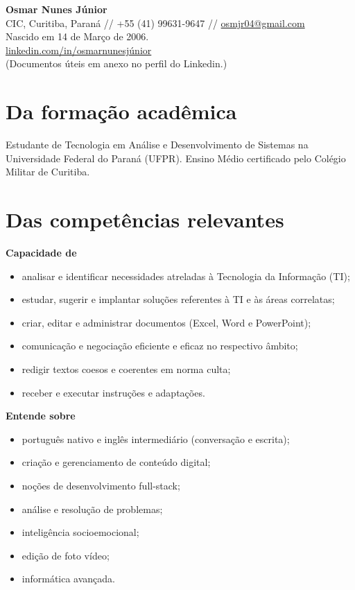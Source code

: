 \documentclass[a4paper,11pt]{article}
\begin{document}
\begin{center}
    {\LARGE \textbf{Osmar Nunes Júnior}} \\ \vspace{0.2cm}
    CIC, Curitiba, Paraná // +55 (41) 99631-9647 // \href{mailto:osmjr04@gmail.com}{osmjr04@gmail.com} \\
    Nascido em 14 de Março de 2006. \\
    \href{https://www.linkedin.com/in/osmarnunesjúnior}{linkedin.com/in/osmarnunesjúnior} \\
    {\small (Documentos úteis em anexo no perfil do Linkedin.)}
\end{center}

\vspace{0.5cm}

\section*{Da formação acadêmica}
Estudante de Tecnologia em Análise e Desenvolvimento de Sistemas na Universidade Federal do Paraná (UFPR). Ensino Médio certificado pelo Colégio Militar de Curitiba.

\section*{Das competências relevantes}
\textbf{Capacidade de}
\begin{itemize}[noitemsep, label={--}]
    \item analisar e identificar necessidades atreladas à Tecnologia da Informação (TI);
    \item estudar, sugerir e implantar soluções referentes à TI e às áreas correlatas;
    \item criar, editar e administrar documentos (Excel, Word e PowerPoint);
    \item comunicação e negociação eficiente e eficaz no respectivo âmbito;
    \item redigir textos coesos e coerentes em norma culta;
    \item receber e executar instruções e adaptações.
\end{itemize}

\vspace{0.3cm}
\textbf{Entende sobre}
\begin{itemize}[noitemsep, label={--}]
    \item português nativo e inglês intermediário (conversação e escrita);
    \item criação e gerenciamento de conteúdo digital;
    \item noções de desenvolvimento full-stack;
    \item análise e resolução de problemas;
    \item inteligência socioemocional;
    \item edição de foto vídeo;
    \item informática avançada.
\end{itemize}
\end{document}
